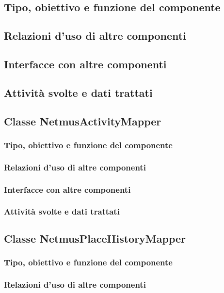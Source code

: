 \subsection*{Tipo, obiettivo e funzione del componente}
\subsection*{Relazioni d'uso di altre componenti}
\subsection*{Interfacce con altre componenti}
\subsection*{Attivit\`a svolte e dati trattati}

\subsection{Classe NetmusActivityMapper}
\subsubsection*{Tipo, obiettivo e funzione del componente}
\subsubsection*{Relazioni d'uso di altre componenti}
\subsubsection*{Interfacce con altre componenti}
\subsubsection*{Attivit\`a svolte e dati trattati}

\subsection{Classe NetmusPlaceHistoryMapper}
\subsubsection*{Tipo, obiettivo e funzione del componente}
\subsubsection*{Relazioni d'uso di altre componenti}
